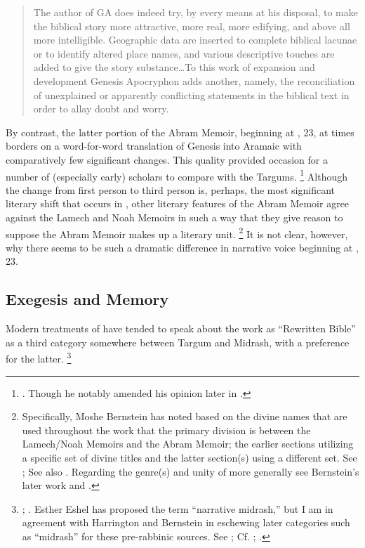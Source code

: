 \begin{quote}
    The author of GA does indeed try, by every means at his disposal, to make the biblical story more attractive, more real, more edifying, and above all more intelligible. Geographic data are inserted to complete biblical lacunae or to identify altered  place names, and various descriptive touches are added to give the story substance\dots To this work of expansion and development Genesis Apocryphon adds another, namely, the reconciliation of unexplained or apparently conflicting statements in the biblical text in order to allay doubt and worry.\autocite[125]{vermes1961}
\end{quote}

By contrast, the latter portion of the Abram Memoir, beginning at , 23, at times borders on a word-for-word translation of Genesis into Aramaic with comparatively few significant changes. This quality provided occasion for a number of (especially early) scholars to compare \ga with the Targums.%
    \footnote{\Cite[193]{black1983}. Though he notably amended his opinion later in \cite*{black_black-fohrer1968}.}
Although the change from first person to third person is, perhaps, the most significant literary shift that occurs in \ga, other literary features of the Abram Memoir agree against the Lamech and Noah Memoirs in such a way that they give reason to suppose the Abram Memoir makes up a literary unit.%
    \footnote{Specifically, Moshe Bernstein has noted based on the divine names that are used throughout the work that the primary division is between the Lamech/Noah Memoirs and the Abram Memoir; the earlier sections utilizing a specific set of divine titles and the latter section(s) using a different set. See \cite{bernstein_jbl2009}; See also \cite[97]{falk2007}. Regarding the genre(s) and unity of \ga more generally see Bernstein's later work \cite*{bernstein_berthelot-etal2010} and \cite*{bernstein_as2010}.}
It is not clear, however, why there seems to be such a dramatic difference in narrative voice beginning at , 23.

\subsection{Exegesis and Memory}

Modern treatments of \ga have tended to speak about the work as ``Rewritten Bible'' as a third category somewhere between Targum and Midrash, with a preference for the latter.%
    \footnote{\Cite{evans_revq1988}; \cite[19]{fitzmyer2004}. Esther Eshel has proposed the term ``narrative midrash,'' but I am in agreement with Harrington and Bernstein in eschewing later categories such as ``midrash'' for these pre-rabbinic sources. See \cite[182]{eshel_roitman-etal2011}; Cf. \cite[242]{harrington_kraft-nickelsburg1986}; \cite[327 n. 33; 328--329]{bernstein_berthelot-etal2010}.}

